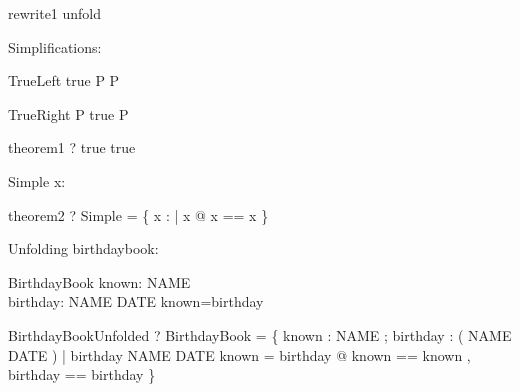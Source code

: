 \begin{zsection}
\SECTION rewrite1 \parents unfold
\end{zsection}

Simplifications:

\begin{zedrule}{TrueLeft}
  true \land P \iff P
\end{zedrule}

\begin{zedrule}{TrueRight}
  P \land true \iff P
\end{zedrule}



\begin{theorem}{theorem1}
  \vdash? true \iff true
\end{theorem}




\begin{schema}{Simple}
  x: \nat
\end{schema}

\begin{theorem}{theorem2}
  \vdash? Simple =
    \{ x : \arithmos | x \in \nat @ \lblot x == x \rblot \}
\end{theorem}



Unfolding birthdaybook:

\begin{zed}\end{zed}

\begin{schema}{BirthdayBook}
    known: \power NAME \\
    birthday: NAME \pfun DATE
\where
    known=\dom birthday
\end{schema}

\begin{theorem}{BirthdayBookUnfolded}
  \vdash? BirthdayBook =
    \{ known : \power NAME ; birthday : \power ( NAME \cross DATE ) |
        birthday \in NAME \pfun DATE \land known = \dom birthday @
    \lblot known == known , birthday == birthday \rblot \}
\end{theorem}
